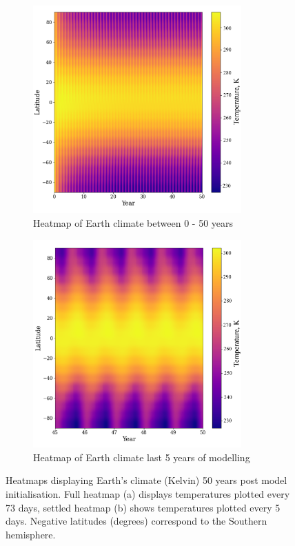 \documentclass[12pt,onecolumn]{revtex4-2}    %
\begin{document}
\begin{figure}[H]
\begin{subfigure}{.5\textwidth}
  \centering
  \includegraphics[width = 8cm]{Earth50yrsHeatmapNew.png}
  \caption{Heatmap of Earth climate between 0 - 50 years}
  \label{fig:sub1}
\end{subfigure}%
\begin{subfigure}{.5\textwidth}
  \centering
  \includegraphics[width=8cm]{Earth5yrsHeatmapNew.png}
  \caption{Heatmap of Earth climate last 5 years of modelling}
  \label{fig:sub2}
\end{subfigure}
\raggedright
\caption{Heatmaps displaying Earth's climate (Kelvin) 50 years post model initialisation. Full heatmap (a) displays temperatures plotted every 73 days, settled heatmap (b) shows temperatures plotted every 5 days. Negative latitudes (degrees) correspond to the Southern hemisphere.}
\label{fig:test}
\end{figure}
\end{document}
